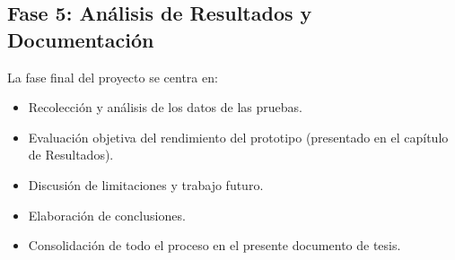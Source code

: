 \subsection{Fase 5: Análisis de Resultados y Documentación} %
\label{subsec:met_fase5} %
La fase final del proyecto se centra en:
\begin{itemize}
    \item Recolección y análisis de los datos de las pruebas.
    \item Evaluación objetiva del rendimiento del prototipo (presentado en el capítulo de Resultados).
    \item Discusión de limitaciones y trabajo futuro.
    \item Elaboración de conclusiones.
    \item Consolidación de todo el proceso en el presente documento de tesis.
\end{itemize}

